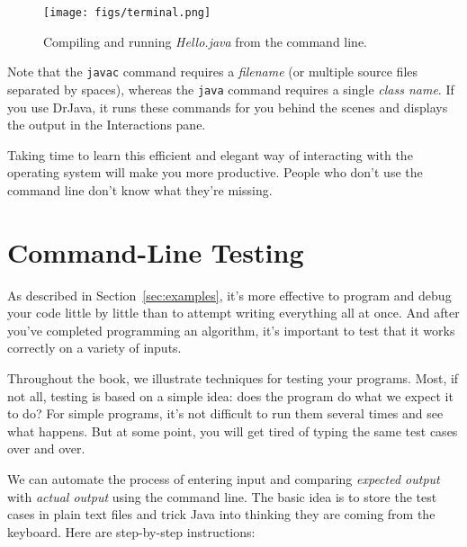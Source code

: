 \begin{figure}[!ht]
\begin{center}
\texttt{[image: figs/terminal.png]}
\caption{Compiling and running {\it Hello.java} from the command line.}
\label{fig.terminal}
\end{center}
\end{figure}

Note that the {\tt javac} command requires a {\em filename} (or multiple source files separated by spaces), whereas the {\tt java} command requires a single {\em class name}.
If you use DrJava, it runs these commands for you behind the scenes and displays the output in the Interactions pane.

Taking time to learn this efficient and elegant way of interacting with the operating system will make you more productive.
People who don't use the command line don't know what they're missing.


\section{Command-Line Testing}
\label{tools_commandline-testing}


As described in Section~\ref{sec:examples}, it's more effective to program and debug your code little by little than to attempt writing everything all at once.
And after you've completed programming an algorithm, it's important to test that it works correctly on a variety of inputs.

Throughout the book, we illustrate techniques for testing your programs.
Most, if not all, testing is based on a simple idea: does the program do what we expect it to do?
For simple programs, it's not difficult to run them several times and see what happens.
But at some point, you will get tired of typing the same test cases over and over.

We can automate the process of entering input and comparing {\em expected output} with {\em actual output} using the command line.
The basic idea is to store the test cases in plain text files and trick Java into thinking they are coming from the keyboard.
Here are step-by-step instructions:

